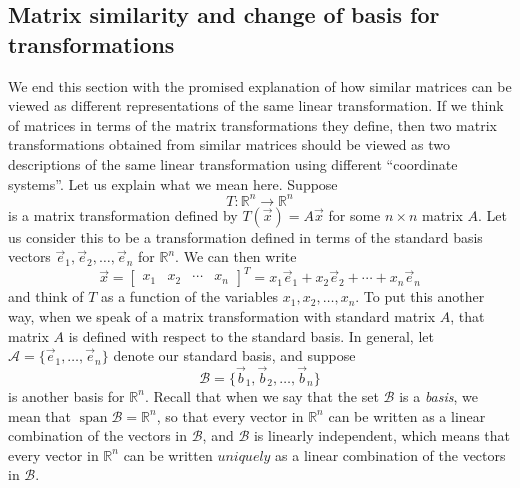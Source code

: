 \documentclass[12pt,letterpaper]{article}
\newcommand{\R}{\mathbb{R}}
\newcommand{\bbm}{\begin{bmatrix}}
\newcommand{\ebm}{\end{bmatrix}}
\begin{document}
\subsection{Matrix similarity and change of basis for transformations}
We end this section with the promised explanation of how similar matrices can be viewed as different representations of the same linear transformation.
If we think of matrices in terms of the matrix transformations they define, then two matrix transformations obtained from similar matrices should be viewed as two descriptions of the same linear transformation using different ``coordinate systems''. Let us explain what we mean here. Suppose
\[
 T:\R^n\to \R^n
\]
is a matrix transformation defined by $T(\vec{x}) = A\vec{x}$ for some $n\times n$ matrix $A$. Let us consider this to be a transformation defined in terms of the standard basis vectors $\vec{e}_1, \vec{e}_2, \ldots, \vec{e}_n$ for $\R^n$. We can then write
\[
 \vec{x} = \bbm x_1 & x_2 & \cdots & x_n\ebm^T = x_1\vec{e}_1+x_2\vec{e}_2+\cdots +x_n\vec{e}_n
\]
and think of $T$ as a function of the variables $x_1,x_2,\ldots, x_n$. To put this another way, when we speak of a matrix transformation with standard matrix $A$, that matrix $A$ is defined with respect to the standard basis. In general, let $\mathcal{A}=\{\vec{e}_1,\ldots, \vec{e}_n\}$ denote our standard basis, and suppose
\[
 \mathcal{B} = \{\vec{b}_1, \vec{b}_2, \ldots, \vec{b}_n\}
\]
is another basis for $\R^n$. Recall that when we say that the set $\mathcal{B}$ is a \textit{basis}, we mean that $\operatorname{span}\mathcal{B} = \R^n$, so that every vector in $\R^n$ can be written as a linear combination of the vectors in $\mathcal{B}$, and $\mathcal{B}$ is linearly independent, which means that every vector in $\R^n$ can be written $\textit{uniquely}$ as a linear combination of the vectors in $\mathcal{B}$.
\end{document}
